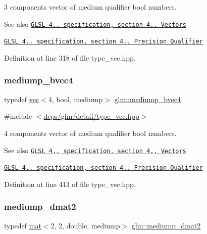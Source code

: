 3 components vector of medium qualifier bool numbers.

\begin{DoxySeeAlso}{See also}
\href{http://www.opengl.org/registry/doc/GLSLangSpec.4.20.8.pdf}{\tt G\+L\+SL 4.. specification, section 4.. Vectors} 

\href{http://www.opengl.org/registry/doc/GLSLangSpec.4.20.8.pdf}{\tt G\+L\+SL 4.. specification, section 4.. Precision Qualifier} 
\end{DoxySeeAlso}


Definition at line 318 of file type\+\_\+vec.\+hpp.

\mbox{\label{group__core__precision_ga064ca037c066a4d47ab6d34c2cf0ae2f}} 
\subsubsection{\texorpdfstring{mediump\+\_\+bvec4}{mediump\_bvec4}}
{\footnotesize\ttfamily typedef \hyperlink{structglm_1_1vec}{vec}$<$4, bool, mediump$>$ \hyperlink{group__core__precision_ga064ca037c066a4d47ab6d34c2cf0ae2f}{glm\+::mediump\+\_\+bvec4}}



{\ttfamily \#include $<$\hyperlink{type__vec_8hpp}{deps/glm/detail/type\+\_\+vec.\+hpp}$>$}

4 components vector of medium qualifier bool numbers.

\begin{DoxySeeAlso}{See also}
\href{http://www.opengl.org/registry/doc/GLSLangSpec.4.20.8.pdf}{\tt G\+L\+SL 4.. specification, section 4.. Vectors} 

\href{http://www.opengl.org/registry/doc/GLSLangSpec.4.20.8.pdf}{\tt G\+L\+SL 4.. specification, section 4.. Precision Qualifier} 
\end{DoxySeeAlso}


Definition at line 413 of file type\+\_\+vec.\+hpp.

\mbox{\label{group__core__precision_gadbf2ed2cfb596bd2ca7e980777c0acde}} 
\subsubsection{\texorpdfstring{mediump\+\_\+dmat2}{mediump\_dmat2}}
{\footnotesize\ttfamily typedef \hyperlink{structglm_1_1mat}{mat}$<$2, 2, double, mediump$>$ \hyperlink{group__core__precision_gadbf2ed2cfb596bd2ca7e980777c0acde}{glm\+::mediump\+\_\+dmat2}}



